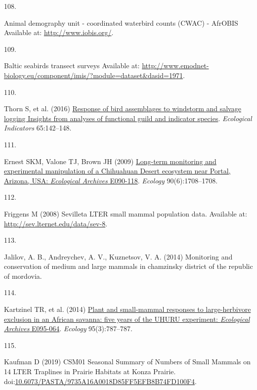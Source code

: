 \documentclass{article}
\newlength{\cslhangindent}
\newlength{\csllabelwidth}
\newlength{\cslentryspacingunit} %
\newenvironment{CSLReferences}[2] %
 {%
  \setlength{\parindent}{0pt}
  \ifodd #1
  \let\oldpar\par
  \def\par{\hangindent=\cslhangindent\oldpar}
  \fi
  \setlength{\parskip}{#2\cslentryspacingunit}
 }%
 {}
\newcommand{\CSLLeftMargin}[1]{\parbox[t]{\csllabelwidth}{#1}}
\newcommand{\CSLRightInline}[1]{\parbox[t]{\linewidth - \csllabelwidth}{#1}\break}
\begin{document}
\begin{CSLReferences}{0}{0}
\leavevmode{}%
\CSLLeftMargin{108. }%
\CSLRightInline{Animal demography unit - coordinated waterbird counts
(CWAC) - AfrOBIS Available at: \url{http://www.iobis.org/}.}

\leavevmode{}%
\CSLLeftMargin{109. }%
\CSLRightInline{Baltic seabirds transect surveys Available at:
\url{http://www.emodnet-biology.eu/component/imis/?module=dataset\&dasid=1971}.}

\leavevmode{}%
\CSLLeftMargin{110. }%
\CSLRightInline{Thorn S, et al. (2016)
\href{https://doi.org/10.1016/j.ecolind.2015.06.033}{Response of bird
assemblages to windstorm and salvage logging {\textemdash} Insights from
analyses of functional guild and indicator species}. \emph{Ecological
Indicators} 65:142--148.}

\leavevmode{}%
\CSLLeftMargin{111. }%
\CSLRightInline{Ernest SKM, Valone TJ, Brown JH (2009)
\href{https://doi.org/10.1890/08-1222.1}{Long-term monitoring and
experimental manipulation of a Chihuahuan Desert ecosystem near Portal,
Arizona, USA: {\emph{Ecological Archives}} E090-118}. \emph{Ecology}
90(6):1708--1708.}

\leavevmode{}%
\CSLLeftMargin{112. }%
\CSLRightInline{Friggens M (2008) Sevilleta LTER small mammal population
data. Available at: \url{http://sev.lternet.edu/data/sev-8}.}

\leavevmode{}%
\CSLLeftMargin{113. }%
\CSLRightInline{Jalilov, A. B., Andreychev, A. V., Kuznetsov, V. A.
(2014) Monitoring and conservation of medium and large mammals in
chamzinsky district of the republic of mordovia.}

\leavevmode{}%
\CSLLeftMargin{114. }%
\CSLRightInline{Kartzinel TR, et al. (2014)
\href{https://doi.org/10.1890/13-1023R.1}{Plant and small-mammal
responses to large-herbivore exclusion in an African savanna: five years
of the UHURU experiment: {\emph{Ecological Archives}} E095-064}.
\emph{Ecology} 95(3):787--787.}

\leavevmode{}%
\CSLLeftMargin{115. }%
\CSLRightInline{Kaufman D (2019) CSM01 Seasonal Summary of Numbers of
Small Mammals on 14 LTER Traplines in Prairie Habitats at Konza Prairie.
doi:\href{https://doi.org/10.6073/PASTA/9735A16A0018D85FF5EFB8B74FD100F4}{10.6073/PASTA/9735A16A0018D85FF5EFB8B74FD100F4}.}


\end{CSLReferences}
\end{document}
